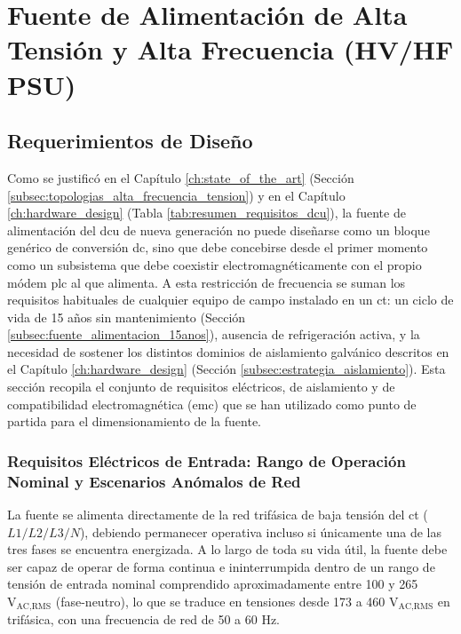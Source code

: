 \chapter{Fuente de Alimentación de Alta Tensión y Alta Frecuencia (HV/HF PSU)}
\label{HV_HF_PSU}

\section{Requerimientos de Diseño}
\label{sec:requerimientos_psu}

Como se justificó en el Capítulo \ref{ch:state_of_the_art} (Sección \ref{subsec:topologias_alta_frecuencia_tension}) y en el Capítulo \ref{ch:hardware_design} (Tabla \ref{tab:resumen_requisitos_dcu}), la fuente de alimentación del \gls{dcu} de nueva generación no puede diseñarse como un bloque genérico de conversión \gls{dc}, sino que debe concebirse desde el primer momento como un subsistema que debe coexistir electromagnéticamente con el propio módem \gls{plc} al que alimenta. A esta restricción de frecuencia se suman los requisitos habituales de cualquier equipo de campo instalado en un \gls{ct}: un ciclo de vida de 15 años sin mantenimiento (Sección \ref{subsec:fuente_alimentacion_15anos}), ausencia de refrigeración activa, y la necesidad de sostener los distintos dominios de aislamiento galvánico descritos en el Capítulo \ref{ch:hardware_design} (Sección \ref{subsec:estrategia_aislamiento}). Esta sección recopila el conjunto de requisitos eléctricos, de aislamiento y de compatibilidad electromagnética (\gls{emc}) que se han utilizado como punto de partida para el dimensionamiento de la fuente.

\subsection{Requisitos Eléctricos de Entrada: Rango de Operación Nominal y Escenarios Anómalos de Red}
\label{subsec:requisitos_entrada_psu}

La fuente se alimenta directamente de la red trifásica de baja tensión del \gls{ct} ($L1/L2/L3/N$), debiendo permanecer operativa incluso si únicamente una de las tres fases se encuentra energizada. A lo largo de toda su vida útil, la fuente debe ser capaz de operar de forma continua e ininterrumpida dentro de un rango de tensión de entrada nominal comprendido aproximadamente entre 100 y 265 $\text{V}_{\text{AC,RMS}}$ (fase-neutro), lo que se traduce en tensiones desde 173 a 460 $\text{V}_{\text{AC,RMS}}$ en trifásica, con una frecuencia de red de 50 a 60 Hz.

